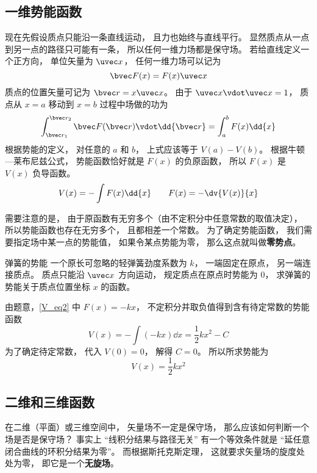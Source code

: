 \subsection{一维势能函数}

现在先假设质点只能沿一条直线运动， 且力也始终与直线平行。 显然质点从一点到另一点的路径只可能有一条， 所以任何一维力场都是保守场。 若给直线定义一个正方向， 单位矢量为 $\uvec x$， 任何一维力场可以记为
\begin{equation}\label{V_eq2}
\bvec F(x) = F(x) \uvec x
\end{equation}
质点的位置矢量可记为 $\bvec r = x \uvec x$。 由于 $\uvec x \vdot \uvec x = 1$， 质点从 $x = a$ 移动到 $x=b$ 过程中场做的功为
\begin{equation}
\int_{\bvec r_1}^{\bvec r_2} \bvec F(\bvec r) \vdot \dd{\bvec r}
= \int_a^b F(x) \dd{x}
\end{equation}
根据势能的定义， 对任意的 $a$ 和 $b$， 上式应该等于 $V(a) - V(b)$。 根据牛顿—莱布尼兹公式， 势能函数恰好就是 $F(x)$ 的负原函数， 所以 $F(x)$ 是 $V(x)$ 负导函数。
\begin{equation}\label{V_eq8}
V(x) = -\int F(x) \dd{x}
\qquad
F(x) = -\dv{V(x)}{x}
\end{equation}

需要注意的是， 由于原函数有无穷多个（由不定积分中任意常数的取值决定）， 所以势能函数也存在无穷多个， 且都相差一个常数。 为了确定势能函数， 我们需要指定场中某一点的势能值， 如果令某点势能为零， 那么这点就叫做\textbf{零势点}。

\begin{example}{弹簧的势能}
一个原长可忽略的轻弹簧劲度系数为 $k$， 一端固定在原点， 另一端连接质点。 质点只能沿 $\uvec x$ 方向运动， 规定质点在原点时势能为 $0$， 求弹簧的势能关于质点位置坐标 $x$ 的函数。 

由题意，\autoref{V_eq2} 中 $F(x) = -kx$， 不定积分并取负值得到含有待定常数的势能函数
\begin{equation}
V(x) = -\int (-kx) \dd{x} = \frac12 k x^2 - C
\end{equation}
为了确定待定常数， 代入 $V(0) = 0$， 解得 $C = 0$。 所以所求势能为
\begin{equation}
V(x) =  \frac12 k x^2
\end{equation}
\end{example}

\subsection{二维和三维函数}
在二维（平面）或三维空间中， 矢量场不一定是保守场， 那么应该如何判断一个场是否是保守场？ 事实上 “线积分结果与路径无关” 有一个等效条件就是 “延任意闭合曲线的环积分结果为零”。 而根据斯托克斯定理， 这就要求矢量场的旋度处处为零， 即它是一个\textbf{无旋场}。

